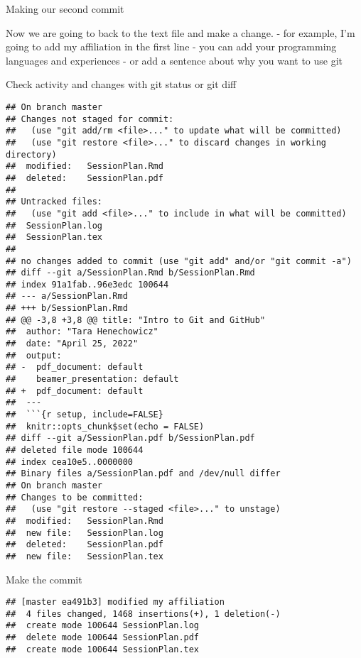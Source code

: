 \documentclass[ignorenonframetext,]{beamer}
\begin{document}
\begin{frame}{Making our second commit}

Now we are going to back to the text file and make a change. - for
example, I'm going to add my affiliation in the first line - you can add
your programming languages and experiences - or add a sentence about why
you want to use git

\end{frame}

\begin{frame}[fragile]{Check activity and changes with git status or git
diff}

\begin{verbatim}
## On branch master
## Changes not staged for commit:
##   (use "git add/rm <file>..." to update what will be committed)
##   (use "git restore <file>..." to discard changes in working directory)
##  modified:   SessionPlan.Rmd
##  deleted:    SessionPlan.pdf
## 
## Untracked files:
##   (use "git add <file>..." to include in what will be committed)
##  SessionPlan.log
##  SessionPlan.tex
## 
## no changes added to commit (use "git add" and/or "git commit -a")
## diff --git a/SessionPlan.Rmd b/SessionPlan.Rmd
## index 91a1fab..96e3edc 100644
## --- a/SessionPlan.Rmd
## +++ b/SessionPlan.Rmd
## @@ -3,8 +3,8 @@ title: "Intro to Git and GitHub"
##  author: "Tara Henechowicz"
##  date: "April 25, 2022"
##  output:
## -  pdf_document: default
##    beamer_presentation: default
## +  pdf_document: default
##  ---
##  ```{r setup, include=FALSE}
##  knitr::opts_chunk$set(echo = FALSE)
## diff --git a/SessionPlan.pdf b/SessionPlan.pdf
## deleted file mode 100644
## index cea10e5..0000000
## Binary files a/SessionPlan.pdf and /dev/null differ
## On branch master
## Changes to be committed:
##   (use "git restore --staged <file>..." to unstage)
##  modified:   SessionPlan.Rmd
##  new file:   SessionPlan.log
##  deleted:    SessionPlan.pdf
##  new file:   SessionPlan.tex
\end{verbatim}

\end{frame}

\begin{frame}[fragile]{Make the commit}

\begin{verbatim}
## [master ea491b3] modified my affiliation
##  4 files changed, 1468 insertions(+), 1 deletion(-)
##  create mode 100644 SessionPlan.log
##  delete mode 100644 SessionPlan.pdf
##  create mode 100644 SessionPlan.tex
\end{verbatim}

\end{frame}
\end{document}
